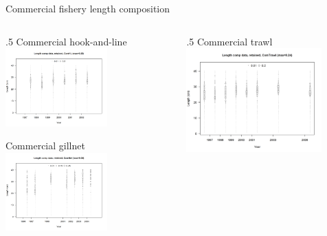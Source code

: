 \documentclass[ignorenonframetext,]{beamer}
\def\begincols{\begin{columns}}
\def\begincol{\begin{column}}
\def\endcol{\end{column}}
\def\endcols{\end{columns}}
\begin{document}
\begin{frame}{Commercial fishery length composition}

\begincols
 \begincol{.5\textwidth} \centering
 Commercial hook-and-line
\includegraphics[height=3cm]{r4ss/plots_mod1/comp_lendat_bubflt1mkt2.png}

Commercial gillnet
\includegraphics[height=3cm]{r4ss/plots_mod1/comp_lendat_bubflt2mkt2.png}
\endcol
 \begincol{.5\textwidth} \centering
 Commercial trawl
\includegraphics[height=4cm]{r4ss/plots_mod1/comp_lendat_bubflt3mkt2.png}
\endcol
\endcols

\end{frame}
\end{document}
